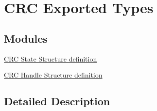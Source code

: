 \hypertarget{group___c_r_c___exported___types}{}\section{C\+RC Exported Types}
\label{group___c_r_c___exported___types}
\subsection*{Modules}
\begin{DoxyCompactItemize}
\item 
\hyperlink{group___c_r_c___exported___types___group1}{C\+R\+C State Structure definition}
\item 
\hyperlink{group___c_r_c___exported___types___group2}{C\+R\+C Handle Structure definition}
\end{DoxyCompactItemize}


\subsection{Detailed Description}

